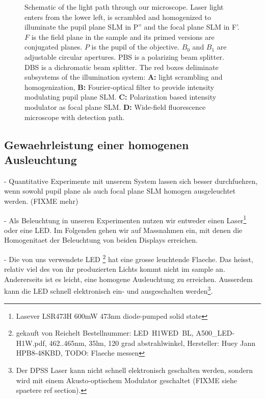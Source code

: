 \begin{figure}[!htbp]
  \centering
  \caption{Schematic of the light path through our microscope. Laser
    light enters from the lower left, is scrambled and homogenized to
    illuminate the pupil plane SLM in P'' and the focal plane SLM in
    F'. $F$ is the field plane in the sample and its primed versions
    are conjugated planes. $P$ is the pupil of the objective. $B_0$
    and $B_1$ are adjustable circular apertures. PBS is a polarizing
    beam splitter. DBS is a dichromatic beam splitter.  The red boxes
    deliminate subsystems of the illumination system: {\bf A:} light
    scrambling and homogenization, {\bf B:} Fourier-optical filter to
    provide intensity modulating pupil plane SLM. {\bf C:} Polarization
    based intensity modulator as focal plane SLM. {\bf D:} Wide-field
    fluorescence microscope with detection path.}
  \label{fig:memi-real}
\end{figure}


\subsection{ Gewaehrleistung einer homogenen Ausleuchtung}
 - Quantitative Experimente mit unserem System lassen sich besser
   durchfuehren, wenn sowohl pupil plane als auch focal plane SLM       %
   homogen ausgeleuchtet werden. (FIXME mehr)


 - Als Beleuchtung in unseren Experimenten nutzen wir entweder einen
   Laser\footnote{Lasever LSR473H 600mW 473nm diode-pumped solid
   state} oder eine LED. Im Folgenden gehen wir auf Massnahmen ein,     %
   mit denen die Homogenitaet der Beleuchtung von beiden Displays
   erreichen.

 - Die von uns verwendete LED \footnote{gekauft von Reichelt
   Bestellnummer: LED~H1WED~BL, A500\_LED-H1W.pdf, 462..465nm, 35lm,
   120 grad abstrahlwinkel, Hersteller: Huey Jann HPB8-48KBD, TODO:
   Flaeche messen} hat eine grosse leuchtende Flaeche.  Das heisst,
   relativ viel des von ihr produzierten Lichts kommt nicht im sample
   an. Andererseits ist es leicht, eine homogene Ausleuchtung zu        %
   erreichen. Ausserdem kann die LED schnell elektronisch ein- und
   ausgeschalten werden\footnote{Der DPSS Laser kann nicht schnell
   elektronisch geschalten werden, sondern wird mit einem
   Akusto-optischem Modulator geschaltet (FIXME siehe spaetere ref
   section).}.
 
